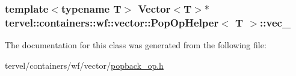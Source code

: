 \subsubsection[{vec\+\_\+}]{\setlength{\rightskip}{0pt plus 5cm}template$<$typename T$>$ Vector$<$T$>$$\ast$ {\bf tervel\+::containers\+::wf\+::vector\+::\+Pop\+Op\+Helper}$<$ T $>$\+::vec\+\_\+\hspace{0.3cm}{\ttfamily [private]}}\label{classtervel_1_1containers_1_1wf_1_1vector_1_1_pop_op_helper_a806490bb4410f0becea1ae1dadd27b33}


The documentation for this class was generated from the following file\+:\begin{DoxyCompactItemize}
\item 
tervel/containers/wf/vector/\hyperlink{popback__op_8h}{popback\+\_\+op.\+h}\end{DoxyCompactItemize}
